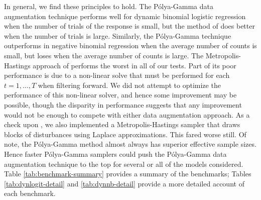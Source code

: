 \documentclass[11pt]{article}
\newcommand{\Polya}{P\'{o}lya}
\begin{document}
In general, we find these principles to hold.  The \Polya-Gamma data
augmentation technique performs well for dynamic binomial logistic regression
when the number of trials of the response is small, but the method of
\cite{fussl-etal-2013} does better when the number of trials is large.
Similarly, the \Polya-Gamma technique outperforms
\cite{fruhwirth-schnatter-etal-2009} in negative binomial regression when the
average number of counts is small, but loses when the average number of counts
is large.  The Metropolis-Hastings approach of \cite{ravines-etal-2006} performs
the worst in all of our tests.  Part of its poor performance is due to a
non-linear solve that must be performed for each $t=1, \ldots, T$ when filtering
forward.  We did not attempt to optimize the performance of this non-linear
solver, and hence some improvement may be possible, though the disparity in
performance suggests that any improvement would not be enough to compete with
either data augmentation approach.  As a check upon \cite{ravines-etal-2006}, we
also implemented a Metropolis-Hastings sampler that draws blocks of disturbances
using Laplace approximations.  This fared worse still.  Of note, the
\Polya-Gamma method almost always has superior effective sample sizes.  Hence
faster \Polya-Gamma samplers could push the \Polya-Gamma data augmentation
technique to the top for several or all of the models considered.  Table
\ref{tab:benchmark-summary} provides a summary of the benchmarks;  Tables
\ref{tab:dynlogit-detail} and \ref{tab:dynnb-detail} provide a more detailed
account of each benchmark.
\end{document}
